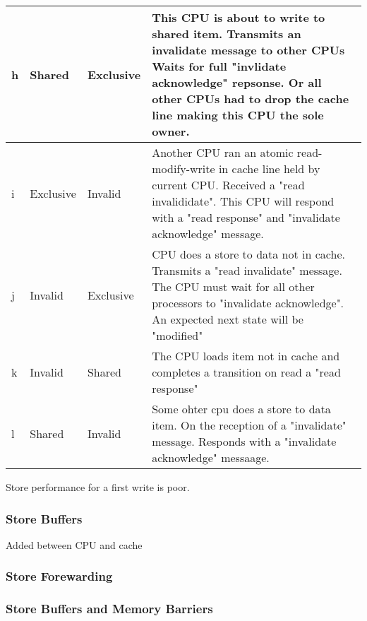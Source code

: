\documentclass{article}
\begin{document}
\begin{center}
\begin{tabular*}{0.75\textwidth} {| l | l | l | l| }
    \\
    \hline

    h & Shared & Exclusive & 

    This CPU is about to write to shared item. Transmits an invalidate
    message to other CPUs Waits for full "invlidate acknowledge"
    repsonse. Or all other CPUs had to drop the cache line making this
    CPU the sole owner. \\
    \hline
    i & Exclusive & Invalid & 

    Another CPU ran an atomic read-modify-write in cache line held by
    current CPU. Received a "read invalididate". This CPU will respond
    with a "read response" and "invalidate acknowledge" message.   \\

    \hline

    j & Invalid & Exclusive &

    CPU does a store to data not in cache. Transmits a "read
    invalidate" message. The CPU must wait for all other processors to
    "invalidate acknowledge". An expected next state will be
    "modified"  
    \\
    \hline

    k & Invalid & Shared &
    
    The CPU loads item not in cache and completes a transition on read
    a "read response"     \\


    \hline
    l & Shared & Invalid &
    
    Some ohter cpu does a store to data item. On the reception of a
    "invalidate" message. Responds with a "invalidate acknowledge"
    messaage. \\

    \hline    
  \end{tabular*}
\end{center}

Store performance for a first write is poor.


\subsubsection{Store Buffers}
Added between CPU and cache
\subsubsection{Store Forewarding}
\subsubsection{Store Buffers and Memory Barriers}
\end{document}

